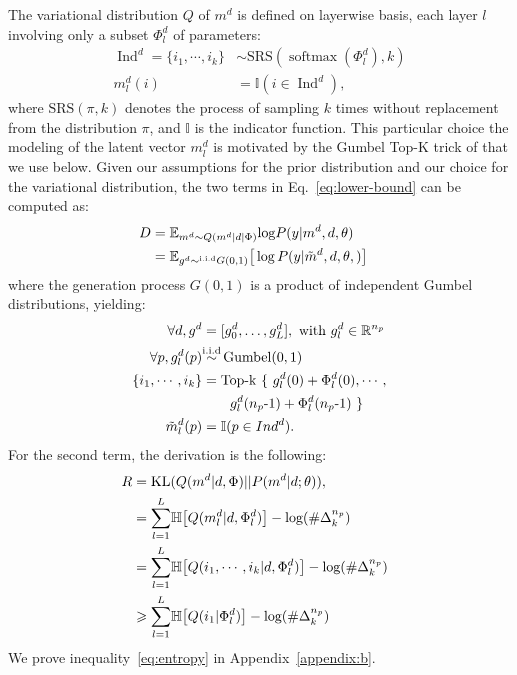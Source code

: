 \documentclass[11pt]{article}
\begin{document}
The variational distribution $Q$ of $m^d$ is defined on layerwise basis, each layer $l$ involving only a subset $\Phi_l^d$ of parameters:
\begin{align}
  \operatorname{Ind}^d = \{ i_1, \cdots, i_k \} & \sim \text{SRS}(\operatorname{softmax}(\Phi_l^d), k) \nonumber \\
  m_l^d(i) & =  \text{$\mathbb{I}$}(i \in \operatorname{Ind}^d), \nonumber
\end{align}
where $\text{SRS}(\pi,k)$ denotes the process of sampling $k$ times without replacement from the distribution $\pi$, and $\mathbb{I}$ is the indicator function. This particular choice the modeling of the latent vector $m_l^d$ is motivated by the Gumbel Top-K trick of \citet{Kool19stochastic} that we use below. Given our assumptions for the prior distribution and our choice for the variational distribution, the two terms in Eq.~\eqref{eq:lower-bound} can be computed as:
\begin{align}
\hspace{-2.em}
D &= \mathbb{E}_{m^d \sim Q(m^d | d | \Phi)} \text{log} P(y | m^d, d, \theta) \nonumber \\
&= \mathbb{E}_{g^d \sim^{\text{i.i.d}} G(0,1)} \big[ \log P(y |\tilde{m}^d,d, \theta,) \big] \nonumber
\end{align}
where the generation process $G(0,1)$ is a product of independent Gumbel distributions, yielding:
\begin{align}
  \hspace{-2.em}
  \forall d,  g^d & =  [g_0^d, \dots, g_L^d],  \text{ with } g_l^d \in \mathbb{R}^{n_p} \nonumber \\
  \forall p,  g_l^d(p) & \displaystyle{\mathop{\sim}^{\text{i.i.d}}} \operatorname{Gumbel}(0,1) \nonumber \\
  \{ i_1, \cdots, i_k \} &= \operatorname{Top-k} \ \{ \ g_l^d(0) + \Phi_l^d(0), \cdots, \label{eq:top-k} \\ 
       & \quad \quad g_l^d(n_p\text{-}1) + \Phi_l^d(n_p\text{-}1) \ \} \nonumber \\
\tilde{m}_l^d(p) &= \mathbb{I}(p \in Ind^d). \nonumber 
\end{align}
For the second term, the derivation is the following:
\begin{align}
\hspace{-2.em}
  R    &= \operatorname{KL}(Q(m^d | d, \Phi)||P(m^d | d; \theta)), \nonumber \\
  &= \displaystyle{\mathop{\sum}_{l=1}^L} \mathbb{H} \big[ Q(m_l^d | d, \Phi_l^d) \big] - \text{log}(\#\Delta^{n_p}_k) \nonumber \\ 
  &= \displaystyle{\mathop{\sum}_{l=1}^L} \mathbb{H}  \big[ Q(i_1,\cdots,i_k | d, \Phi_l^d) \big] - \text{log}(\#\Delta^{n_p}_k)  \nonumber  \\ 
	&  \geqslant \displaystyle{\mathop{\sum}_{l=1}^L} \mathbb{H} \big[ Q(i_1 | \Phi_l^d) \big] - \text{log}(\#\Delta^{n_p}_k) \label{eq:entropy}
\end{align}
We prove inequality~\eqref{eq:entropy} in Appendix~\ref{appendix:b}.
\end{document}
